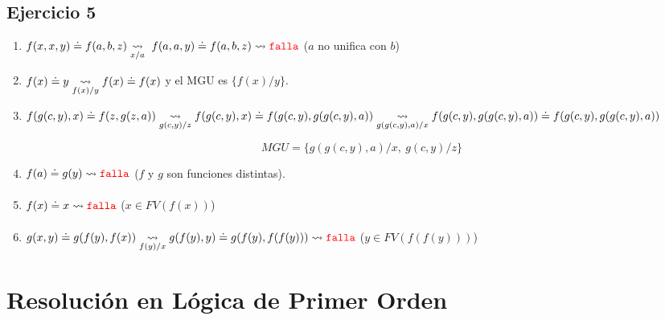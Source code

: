 \documentclass[10pt,a4paper]{article}
\begin{document}
\subsection{Ejercicio 5}
\begin{enumerate}
    \item $f(x,x,y) \doteq f(a,b,z) \underset{x/a}{\overset{}{\leadsto}}~f(a,a,y) \doteq f(a,b,z)\underset{}{\overset{}{\leadsto}} {\color{red}\texttt{falla}}$ ($a$ no unifica con $b$)
    \item $f(x) \doteq y\underset{f(x)/y}{\overset{}{\leadsto}} f (x)\doteq f(x)$ y el MGU es $\{f(x)/y\}$.
    \item $f(g(c,y),x) \doteq f(z,g(z,a)) \underset{g(c,y)/z}{\overset{}{\leadsto}} f(g(c,y),x) \doteq f(g(c,y),g(g(c,y),a)) \\[10pt] \underset{g(g(c,y),a)/x}{\overset{}{\leadsto}} f(g(c,y),g(g(c,y),a)) \doteq f(g(c,y),g(g(c,y),a))$
    
    $$MGU = \{g(g(c,y),a)/x,~g(c,y)/z\}$$
    \item $f(a) \doteq g(y) \underset{}{\overset{}{\leadsto}} {\color{red}\texttt{falla}}$ ($f$ y $g$ son funciones distintas).
    
    \item $f(x) \doteq x \underset{}{\overset{}{\leadsto}} {\color{red}\texttt{falla}}$ ($x \in FV(f(x))$)
    \item $g(x,y) \doteq g(f(y),f(x)) \underset{f(y)/x}{\overset{}{\leadsto}} g(f(y),y) \doteq g(f(y),f(f(y))) \underset{}{\overset{}{\leadsto}} {\color{red}\texttt{falla}}$ ($y \in FV(f(f(y)))$)
\end{enumerate}

\newpage
\section*{Resolución en Lógica de Primer Orden}
\end{document}
